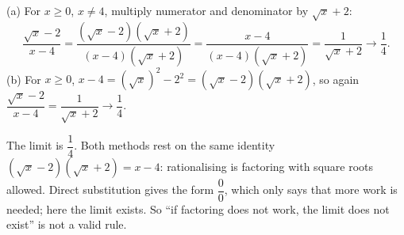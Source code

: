 (a) For $x\ge0$, $x\ne4$, multiply numerator and denominator by $\sqrt x+2$:
\[
\dfrac{\sqrt x-2}{x-4}=\dfrac{(\sqrt x-2)(\sqrt x+2)}{(x-4)(\sqrt x+2)}=\dfrac{x-4}{(x-4)(\sqrt x+2)}=\dfrac{1}{\sqrt x+2}\longrightarrow\dfrac{1}{4} .
\]
(b) For $x\ge0$, $x-4=\left(\sqrt x\right)^2-2^2=(\sqrt x-2)(\sqrt x+2)$, so again $\dfrac{\sqrt x-2}{x-4}=\dfrac{1}{\sqrt x+2}\to\dfrac{1}{4}$.

The limit is $\boxed{\dfrac{1}{4}}$. Both methods rest on the same identity $(\sqrt x-2)(\sqrt x+2)=x-4$: rationalising is factoring with square roots allowed. Direct substitution gives the form $\dfrac{0}{0}$, which only says that more work is needed; here the limit exists. So ``if factoring does not work, the limit does not exist'' is not a valid rule.
